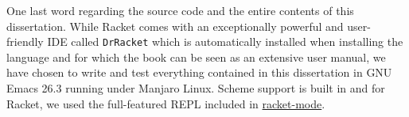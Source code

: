 \vspace{0.3cm}

\begin{remark}\label{rk:resources}
  One last word regarding the source code and the entire contents of this
  dissertation. While Racket comes with an exceptionally powerful and user-friendly
  IDE called \texttt{DrRacket} which is automatically installed when installing
  the language and for which the book \cite{htdp} can be seen as an extensive
  user manual, we have chosen to write and test everything contained in this
  dissertation in GNU Emacs 26.3 running under Manjaro Linux. Scheme support is
  built in and for Racket, we used the full-featured REPL included in
  \href{https://www.racket-mode.com/}{racket-mode}.
\end{remark}

